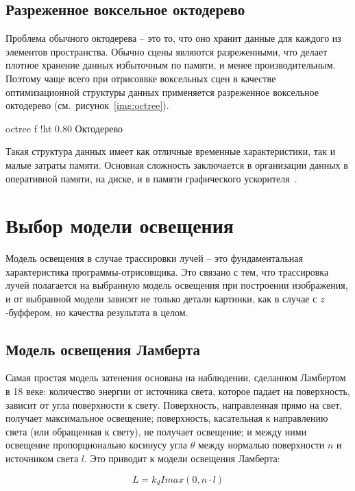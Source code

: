 \subsection{Разреженное воксельное октодерево}

Проблема обычного октодерева -- это то, что оно хранит данные для каждого из элементов 
пространства. Обычно сцены являются разреженными, что делает плотное хранение данных
избыточным по памяти, и менее производительным. Поэтому чаще всего при отрисоввке
воксельных сцен в качестве оптимизационной структуры данных применяется разреженное воксельное
октодерево (см.~рисунок~\ref{img:octree}).

    {octree}
    {f}
    {!ht}
    {0.80\textwidth}
    {Октодерево}

Такая структура данных имеет как отличные временные характеристики, так и малые затраты памяти.
Основная сложность заключается в организации данных в оперативной памяти, на диске, 
и в памяти графического ускорителя~\cite{ESVOAEaI}.

\section{Выбор модели освещения}

Модель освещения в случае трассировки лучей -- это фундаментальная характеристика программы-отрисовщика. Это связано с тем, что трассировка лучей полагается на выбранную модель освещения
при построении изображения, и от выбранной модели зависят не только детали картинки, как в случае с $z$-буффером, но качества результата в целом.

\subsection{Модель освещения Ламберта}
Самая простая модель затенения основана на наблюдении, сделанном Ламбертом в 18 веке: 
количество энергии от источника света, которое падает на поверхность, зависит от угла 
поверхности к свету. Поверхность, направленная прямо на свет, получает максимальное 
освещение; поверхность, касательная к направлению света (или обращенная к свету), 
не получает освещение; и между ними освещение пропорционально косинусу угла $\theta$
между нормалью поверхности $n$ и источником света $l$. Это приводит к 
модели освещения Ламберта:

\begin{equation}
L = k_d I max(0, n \cdot l)
\end{equation}

